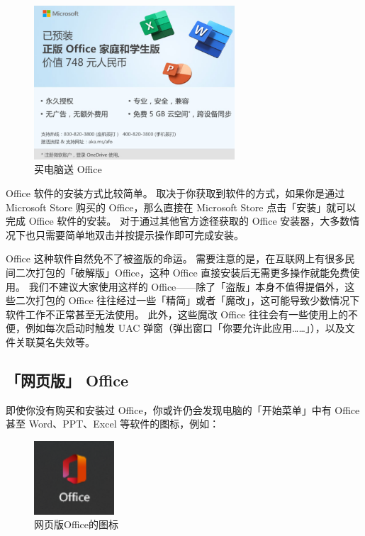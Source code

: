 \begin{figure}[htb!]
  \centering
  \includegraphics[width=7.5cm]{assets/JD_Office_Gift.png}
  \caption{买电脑送 Office}
  \label{JD_Office_Gift}
\end{figure}

Office 软件的安装方式比较简单。
取决于你获取到软件的方式，如果你是通过 Microsoft Store 购买的 Office，那么直接在 Microsoft Store 点击「安装」就可以完成 Office 软件的安装。
对于通过其他官方途径获取的 Office 安装器，大多数情况下也只需要简单地双击并按提示操作即可完成安装。

Office 这种软件自然免不了被盗版的命运。
需要注意的是，在互联网上有很多民间二次打包的「破解版」Office，这种 Office 直接安装后无需更多操作就能免费使用。
我们不建议大家使用这样的 Office——除了「盗版」本身不值得提倡外，这些二次打包的 Office 往往经过一些「精简」或者「魔改」，这可能导致少数情况下软件工作不正常甚至无法使用。
此外，这些魔改 Office 往往会有一些使用上的不便，例如每次启动时触发 UAC 弹窗（弹出窗口「你要允许此应用……」），以及文件关联莫名失效等。

\subsection{「网页版」 Office}

即使你没有购买和安装过 Office，你或许仍会发现电脑的「开始菜单」中有 Office 甚至 Word、PPT、Excel 等软件的图标，例如：

\begin{figure}[htb!]
  \centering
  \includegraphics[width=3cm]{assets/Office_Web_Icon.png}
  \caption{网页版Office的图标}
  \label{Office_Web_Icon}
\end{figure}

